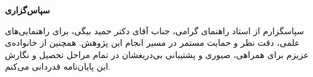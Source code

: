 \begin{center}
\textbf{سپاس‌گزاری}
\end{center}
\noindent

سپاسگزارم از استاد راهنمای گرامی، جناب آقای دکتر حمید بیگی، برای راهنمایی‌های علمی، دقت نظر و حمایت مستمر در مسیر انجام این پژوهش. همچنین از خانواده‌ی عزیزم برای همراهی، صبوری و پشتیبانی بی‌دریغشان در تمام مراحل تحصیل و نگارش این پایان‌نامه قدردانی می‌کنم.
